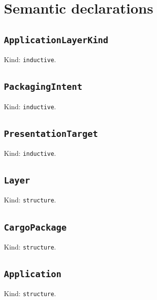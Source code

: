 \documentclass[11pt]{article}
\begin{document}
\section*{Semantic declarations}
\subsection*{\texttt{ApplicationLayerKind}}
\noindent Kind: \texttt{inductive}.\par
\subsection*{\texttt{PackagingIntent}}
\noindent Kind: \texttt{inductive}.\par
\subsection*{\texttt{PresentationTarget}}
\noindent Kind: \texttt{inductive}.\par
\subsection*{\texttt{Layer}}
\noindent Kind: \texttt{structure}.\par
\subsection*{\texttt{CargoPackage}}
\noindent Kind: \texttt{structure}.\par
\subsection*{\texttt{Application}}
\noindent Kind: \texttt{structure}.\par
\end{document}
